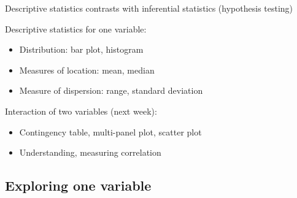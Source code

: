 \documentclass[aspectratio=169,usenames,dvipsnames]{beamer}
\begin{document}
\begin{frame}{Descriptive statistics}
 contrasts with inferential statistics
    (hypothesis testing)

\vspace{1em}
Descriptive statistics for one variable:
\begin{itemize}
    \item Distribution: bar plot, histogram
    \item Measures of location: mean, median
    \item Measure of dispersion: range, standard deviation
\end{itemize}

\pause
Interaction of two variables (next week):
\begin{itemize}
    \item Contingency table, multi-panel plot, scatter plot
    \item Understanding, measuring correlation
\end{itemize}
\end{frame}

\subsection{Exploring one variable}
\frame{\tableofcontents[currentsubsection]}
\end{document}
